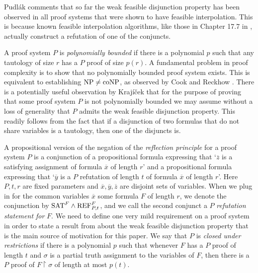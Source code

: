 Pudl\'ak \cite{Pudlak2003} comments that so far the weak feasible disjunction property has been observed in all proof systems that were shown to have feasible interpolation. This is because known feasible interpolation algorithms, like those in Chapter 17.7 in \cite{Krajicek2019-book}, actually construct a refutation of one of the conjuncts.

A proof system $P$ is \emph{polynomially bounded} if there is a polynomial $p$ such that any tautology of size $r$ has a $P$ proof of size $p(r)$. A fundamental problem in proof complexity is to show that no polynomially bounded proof system exists. This is equivalent to establishing $\textnormal{NP} \neq \textnormal{coNP}$, as observed by Cook and Reckhow \cite{cook-reckhow1979}. There is a potentially useful observation by Kraj\'{i}\v{c}ek \cite{Krajicek2011} that for the purpose of proving that some proof system $P$ is not polynomially bounded we may assume without a loss of generality that $P$ admits the weak feasible disjunction property. This readily follows from the fact that if a disjunction of two formulas that do not share variables is a tautology, then one of the disjuncts is. 

A propositional version of the negation of the \emph{reflection principle} for a proof system $P$ is a conjunction of a propositional formula expressing that `$\overline{z}$ is a satisfying assignment of formula $\overline{x}$ of length $r$' and a propositional formula expressing that `$\overline{y}$ is a $P$ refutation of length $t$ of formula $\overline{x}$ of length $r$'. Here $P, t, r$ are fixed parameters and $\overline{x},\overline{y},\overline{z}$ are disjoint sets of variables. When we plug in for the common variables  $\overline{x}$ some formula $F$ of length $r$, we denote the conjunction by $\textnormal{SAT}^F \land \textnormal{REF}^F_{P,t}$, and we call the second conjunct a $P$ \emph{refutation statement for} $F$. We need to define one very mild requirement on a proof system in order to state a result from \cite{Pudlak2003} about the weak feasible disjunction property that is the main source of motivation for this paper. 
We say that $P$ is \emph{closed under restrictions} if there is a polynomial $p$ such that whenever $F$ has a $P$ proof of length $t$ and $\sigma$ is a partial truth assignment to the variables of $F$, then there is a $P$ proof of $F \! \restriction \! \sigma$ of length at most $p(t)$.

